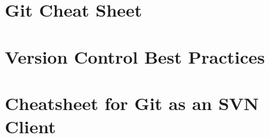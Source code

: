 \chapter{Git Cheat Sheet}








\chapter{Version Control Best Practices}



\chapter{Cheatsheet for Git as an SVN Client}

